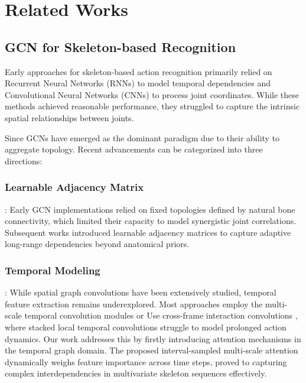 \section{Related Works}

\subsection{GCN for Skeleton-based Recognition}

Early approaches for skeleton-based action recognition primarily 
relied on Recurrent Neural Networks (RNNs) \cite{ref4,ref5} to model 
temporal dependencies and Convolutional Neural Networks (CNNs) 
\cite{ref6} to process joint coordinates. While these methods achieved 
reasonable performance, they struggled to capture the intrinsic spatial 
relationships between joints.

Since GCNs \cite{ref7,ref8} have emerged as the dominant 
paradigm due to their ability to aggregate topology. Recent 
advancements can be categorized into three directions:

\subsubsection{Learnable Adjacency Matrix}: Early GCN implementations
 \cite{ref7} relied on fixed topologies defined by natural bone 
 connectivity, which limited their capacity to model synergistic joint 
 correlations. Subsequent works \cite{ref8,ref9,ref10,ref11,ref12,ref14,ref15,ref16} introduced learnable 
 adjacency matrices to capture adaptive long-range dependencies beyond 
 anatomical priors.

\subsubsection{Temporal Modeling}: While spatial graph convolutions 
have been extensively studied, temporal feature extraction remains 
underexplored. Most approaches employ the multi-scale 
temporal convolution modules \cite{ref9,ref10,ref11,ref12,ref13} or Use cross-frame 
interaction convolutions \cite{ref15}, where stacked local temporal convolutions 
struggle to model prolonged action dynamics. Our work addresses this by
firstly introducing attention mechanisms in the temporal graph domain. The 
proposed interval-sampled multi-scale attention dynamically weighs 
feature importance across time steps, proved to capturing complex 
interdependencies in multivariate skeleton sequences effectively. 

